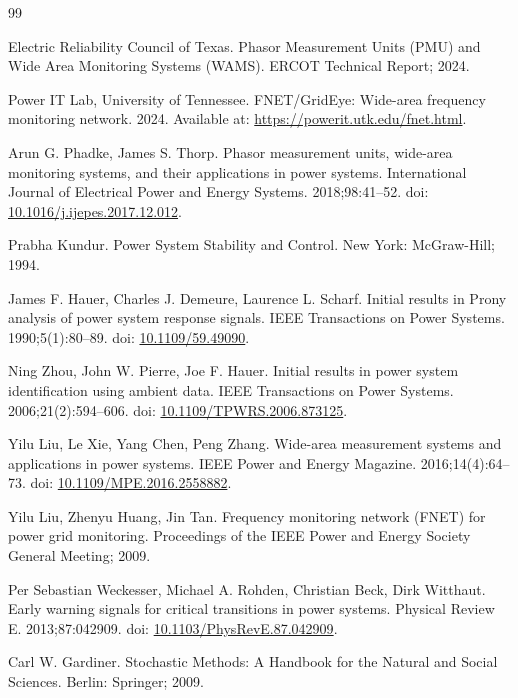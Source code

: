 \documentclass[11pt,letterpaper]{article}
\begin{document}
\begin{thebibliography}{99}
\setlength{\itemsep}{0.6\baselineskip}

\bibitem{} Electric Reliability Council of Texas. Phasor Measurement Units (PMU) and Wide Area Monitoring Systems (WAMS). ERCOT Technical Report; 2024.

\bibitem{} Power IT Lab, University of Tennessee. FNET/GridEye: Wide-area frequency monitoring network. 2024. Available at: \href{https://powerit.utk.edu/fnet.html}{https://powerit.utk.edu/fnet.html}.

\bibitem{} Arun G. Phadke, James S. Thorp. Phasor measurement units, wide-area monitoring systems, and their applications in power systems. International Journal of Electrical Power and Energy Systems. 2018;98:41--52. doi: \href{https://doi.org/10.1016/j.ijepes.2017.12.012}{10.1016/j.ijepes.2017.12.012}.

\bibitem{} Prabha Kundur. Power System Stability and Control. New York: McGraw-Hill; 1994.

\bibitem{} James F. Hauer, Charles J. Demeure, Laurence L. Scharf. Initial results in Prony analysis of power system response signals. IEEE Transactions on Power Systems. 1990;5(1):80--89. doi: \href{https://doi.org/10.1109/59.49090}{10.1109/59.49090}.

\bibitem{} Ning Zhou, John W. Pierre, Joe F. Hauer. Initial results in power system identification using ambient data. IEEE Transactions on Power Systems. 2006;21(2):594--606. doi: \href{https://doi.org/10.1109/TPWRS.2006.873125}{10.1109/TPWRS.2006.873125}.

\bibitem{} Yilu Liu, Le Xie, Yang Chen, Peng Zhang. Wide-area measurement systems and applications in power systems. IEEE Power and Energy Magazine. 2016;14(4):64--73. doi: \href{https://doi.org/10.1109/MPE.2016.2558882}{10.1109/MPE.2016.2558882}.

\bibitem{} Yilu Liu, Zhenyu Huang, Jin Tan. Frequency monitoring network (FNET) for power grid monitoring. Proceedings of the IEEE Power and Energy Society General Meeting; 2009.

\bibitem{} Per Sebastian Weckesser, Michael A. Rohden, Christian Beck, Dirk Witthaut. Early warning signals for critical transitions in power systems. Physical Review E. 2013;87:042909. doi: \href{https://doi.org/10.1103/PhysRevE.87.042909}{10.1103/PhysRevE.87.042909}.

\bibitem{} Carl W. Gardiner. Stochastic Methods: A Handbook for the Natural and Social Sciences. Berlin: Springer; 2009.


\end{thebibliography}
\end{document}
